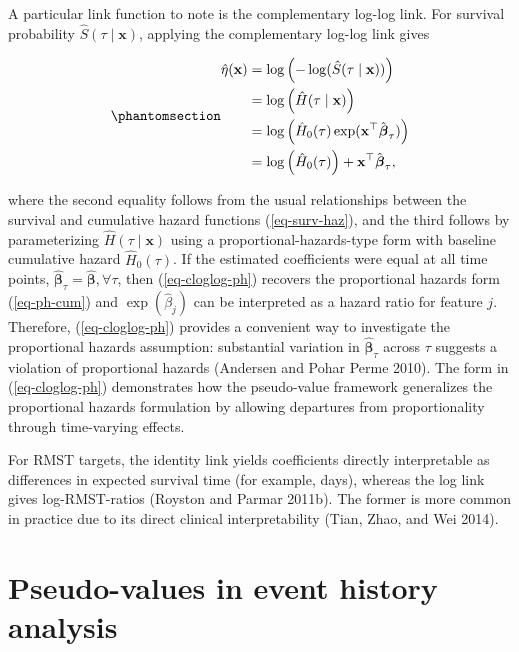 \documentclass[
  letterpaper,
  krantz2]{style/krantz}
\begin{document}
A particular link function to note is the complementary log-log
link. For survival probability
\(\hat{S}(\tau \mid \mathbf{x})\), applying the complementary log-log
link gives

\begin{equation}\phantomsection\label{eq-cloglog-ph}{
\begin{aligned}
\hat\eta(\mathbf{x})
&= \log\left(-\log(\hat{S}(\tau \mid \mathbf{x}))\right) \\
&= \log\left(\hat{H}(\tau \mid \mathbf{x})\right) \\
&= \log\left(\hat{H}_0(\tau)\exp(\mathbf{x}^\top\hat{\boldsymbol{\beta}}_\tau)\right) \\
&= \log\left(\hat{H}_0(\tau)\right) + \mathbf{x}^\top\hat{\boldsymbol{\beta}}_\tau,
\end{aligned}
}\end{equation}

where the second equality follows from the usual relationships between
the survival and cumulative hazard functions (\ref{eq-surv-haz}), and
the third follows by parameterizing \(\hat{H}(\tau \mid \mathbf{x})\)
using a proportional-hazards-type form with baseline cumulative hazard
\(\hat{H}_0(\tau)\). If the estimated coefficients were equal at all
time points,
\(\hat{\boldsymbol{\beta}}_\tau = \hat{\boldsymbol{\beta}}, \forall \tau\),
then (\ref{eq-cloglog-ph}) recovers the proportional hazards form
(\ref{eq-ph-cum}) and \(\exp(\hat{\beta}_j)\) can be interpreted as a
hazard ratio for feature \(j\). Therefore,
(\ref{eq-cloglog-ph}) provides a convenient way to investigate the
proportional hazards assumption: substantial variation in
\(\hat{\boldsymbol{\beta}}_\tau\) across \(\tau\) suggests a violation
of proportional hazards (Andersen and Pohar Perme 2010). The form in
(\ref{eq-cloglog-ph}) demonstrates how the pseudo-value framework
generalizes the proportional hazards formulation by allowing departures
from proportionality through time-varying
effects.

For RMST targets, the identity link yields coefficients directly
interpretable as differences in expected survival time (for example,
days), whereas the log link gives log-RMST-ratios (Royston and Parmar
2011b). The former is more common in practice due to its direct clinical
interpretability (Tian, Zhao, and Wei 2014).

\section{Pseudo-values in event history
analysis}\label{sec-pseudo-value-eha}
\end{document}
